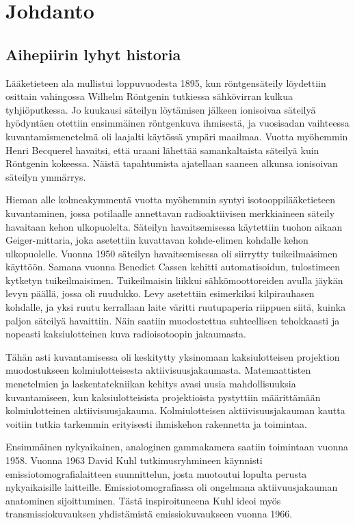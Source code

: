 \section{Johdanto}
\subsection{Aihepiirin lyhyt historia}
Lääketieteen ala mullistui loppuvuodesta 1895, kun röntgensäteily löydettiin osittain vahingossa Wilhelm Röntgenin tutkiessa sähkövirran kulkua tyhjiöputkessa. Jo kuukausi säteilyn löytämisen jälkeen ionisoivaa säteilyä hyödyntäen otettiin ensimmäinen röntgenkuva ihmisestä, ja vuosisadan vaihteessa kuvantamismenetelmä oli laajalti käytössä ympäri maailmaa.\cite{bercovich_medical_2018} Vuotta myöhemmin Henri Becquerel havaitsi, että uraani lähettää samankaltaista säteilyä kuin Röntgenin kokeessa. Näistä tapahtumista ajatellaan saaneen alkunsa ionisoivan säteilyn ymmärrys.

Hieman alle kolmeakymmentä vuotta myöhemmin syntyi isotooppilääketieteen kuvantaminen, jossa potilaalle annettavan radioaktiivisen merkkiaineen säteily havaitaan kehon ulkopuolelta. Säteilyn havaitsemisessa käytettiin tuohon aikaan Geiger-mittaria, joka asetettiin kuvattavan kohde-elimen kohdalle kehon ulkopuolelle. Vuonna 1950 säteilyn havaitsemisessa oli siirrytty tuikeilmaisimen käyttöön. Samana vuonna Benedict Cassen kehitti automatisoidun, tulostimeen kytketyn tuikeilmaisimen. Tuikeilmaisin liikkui sähkömoottoreiden avulla jäykän levyn päällä, jossa oli ruudukko. Levy asetettiin esimerkiksi kilpirauhasen kohdalle, ja yksi ruutu kerrallaan laite väritti ruutupaperia riippuen siitä, kuinka paljon säteilyä havaittiin. Näin saatiin muodostettua suhteellisen tehokkaasti ja nopeasti kaksiulotteinen kuva radioisotoopin jakaumasta.\cite{jaszczak_early_2006}

Tähän asti kuvantamisessa oli keskitytty yksinomaan kaksiulotteisen projektion muodostukseen kolmiulotteisesta aktiivisuusjakaumasta. Matemaattisten menetelmien ja laskentatekniikan kehitys avasi uusia mahdollisuuksia kuvantamiseen, kun kaksiulotteisista projektioista pystyttiin määrittämään kolmiulotteinen aktiivisuusjakauma. Kolmiulotteisen aktiivisuusjakauman kautta voitiin tutkia tarkemmin erityisesti ihmiskehon rakennetta ja toimintaa.

Ensimmäinen nykyaikainen, analoginen gammakamera saatiin toimintaan vuonna 1958\cite{hutton_origins_2014}. Vuonna 1963 David Kuhl tutkimusryhmineen käynnisti emissiotomografialaitteen suunnittelun, josta muotoutui lopulta perusta nykyaikaisille laitteille\cite{jaszczak_early_2006, hutton_origins_2014}. Emissiotomografiassa oli ongelmana aktiivuusjakauman anatominen sijoittuminen. Tästä inspiroituneena Kuhl ideoi myös transmissiokuvauksen yhdistämistä emissiokuvaukseen vuonna 1966\cite{jaszczak_early_2006}.

